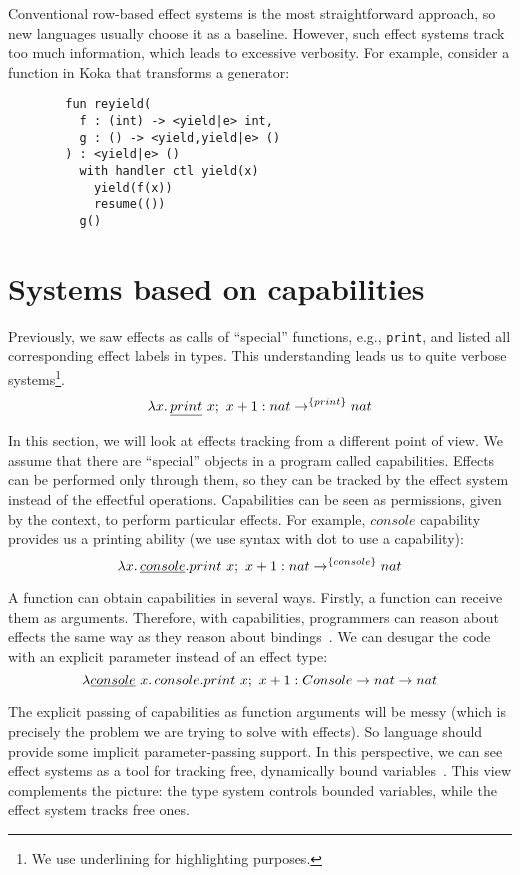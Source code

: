 \documentclass[conference]{IEEEtran}
\newcommand{\seq}{;~}
\newcommand{\ap}{~}
\begin{document}
    Conventional row-based effect systems is the most straightforward approach, so new languages usually choose it as a baseline.
    However, such effect systems track too much information, which leads to excessive verbosity.
    For example, consider a function in Koka that transforms a generator:
    \begin{verbatim}
        fun reyield(
          f : (int) -> <yield|e> int,
          g : () -> <yield,yield|e> ()
        ) : <yield|e> ()
          with handler ctl yield(x)
            yield(f(x))
            resume(())
          g()
    \end{verbatim}


    \section{Systems based on capabilities} \label{sec:capabilities}

    Previously, we saw effects as calls of ``special'' functions, e.g., \texttt{print}, and listed all corresponding effect labels in types.
    This understanding leads us to quite verbose systems\footnote{We use underlining for highlighting purposes.}.
    \[\lambda x\ldotp \underline{print}\ap x\seq x + 1 : nat \to^{\{print\}} nat\]

    In this section, we will look at effects tracking from a different point of view.
    We assume that there are ``special'' objects in a program called capabilities.
    Effects can be performed only through them, so they can be tracked by the effect system instead of the effectful operations.
    Capabilities can be seen as permissions, given by the context, to perform particular effects.
    For example, $console$ capability provides us a printing ability (we use syntax with dot to use a capability):
    \[\lambda x\ldotp \underline{console}.print\ap x\seq x + 1 : nat \to^{\{console\}} nat\]


    A function can obtain capabilities in several ways.
    Firstly, a function can receive them as arguments.
    Therefore, with capabilities, programmers can reason about effects the same way as they reason about bindings~\cite{brachthauser2022effects}.
    We can desugar the code with an explicit parameter instead of an effect type:
    \[\lambda \underline{console} \ap x \ldotp console.print\ap x\seq x + 1 : Console \to nat \to nat\]

    The explicit passing of capabilities as function arguments will be messy (which is precisely the problem we are trying to solve with effects).
    So language should provide some implicit parameter-passing support.
    In this perspective, we can see effect systems as a tool for tracking free, dynamically bound variables~\cite{odersky2022scoped}.
    This view complements the picture: the type system controls bounded variables, while the effect system tracks free ones.
\end{document}
